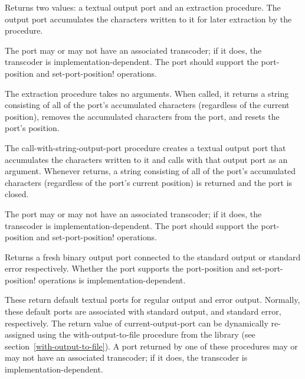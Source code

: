 \begin{entry}{%
}

Returns two values: a textual output port and an extraction procedure.
The output port accumulates the characters written to it for
later extraction by the procedure.

The port may or may not have an associated transcoder; if it does, the
transcoder is implementation-dependent.  The port should support the {\cf
  port-position} and {\cf set-port-position!} operations.

The extraction procedure takes no arguments.
When called, it returns a string consisting of all of the port's
accumulated characters (regardless of the current position),
removes the accumulated characters from the port, and resets
the port's position.
\end{entry}

\begin{entry}{%
}

The {\cf call-with-string-output-port} procedure creates a textual output port that accumulates the
characters written to it and calls  with that output port
as an argument.  Whenever  returns, a string consisting of all
of the port's accumulated characters (regardless of the port's current
position) is returned and the port is closed.

The port may or may not have an associated transcoder; if it does, the
transcoder is implementation-dependent.  The port should support the
{\cf port-position} and {\cf set-port-position!} operations.
\end{entry}

\begin{entry}{%
}
   
Returns a fresh binary output port connected to the standard output or
standard error respectively.  Whether the port supports the {\cf
  port-position} and {\cf set-port-position!} operations is
implementation-dependent.
\end{entry}

\begin{entry}{%
}
 
These return default textual ports for regular output and error
output.  Normally, these default ports are associated with standard
output, and standard error, respectively.  The return value of {\cf
  current-output-port} can be dynamically re-assigned using the {\cf
  with-output-to-file} procedure from the 
library (see section~\ref{with-output-to-file}).  A port returned by
one of these procedures may or may not have an associated transcoder;
if it does, the transcoder is implementation-dependent.
\end{entry}


